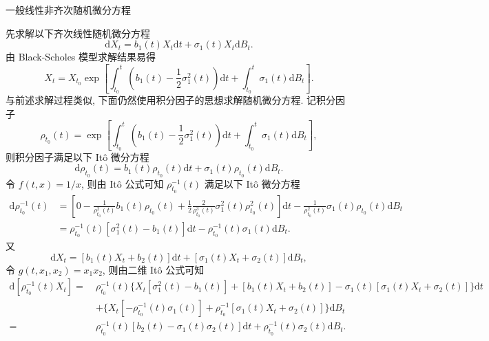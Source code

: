 \documentclass[openany]{ctexbook}
\theoremstyle{kaiti}
\theoremstyle{normal}
\begin{document}
一般线性非齐次随机微分方程

先求解以下齐次线性随机微分方程
\begin{equation}
  \mathrm{d}X_t=b_1(t) X_t\mathrm{d}t+\sigma_1(t) X_t\mathrm{d}B_t.
\end{equation}
由 Black-Scholes 模型求解结果易得
\begin{equation}
  X_t=X_{t_0}\exp\left[\int_{t_0}^t\left(b_1(t)-\frac{1}{2}\sigma_1^2(t)\right)\mathrm{d}t+\int_{t_0}^t\sigma_1(t) \mathrm{d}B_t\right].
\end{equation}
与前述求解过程类似, 下面仍然使用积分因子的思想求解随机微分方程. 记积分因子
\begin{equation}
  \rho_{t_0}(t)=\exp\left[\int_{t_0}^t\left(b_1(t)-\frac{1}{2}\sigma_1^2(t)\right)\mathrm{d}t+\int_{t_0}^t\sigma_1(t) \mathrm{d}B_t\right],
\end{equation}
则积分因子满足以下 It\^o 微分方程
\begin{equation}
  \mathrm{d}\rho_{t_0}(t)=b_1(t) \rho_{t_0}(t)\mathrm{d}t+\sigma_1(t) \rho_{t_0}(t)\mathrm{d}B_t.
\end{equation}
令 $f(t,x)=1/x$, 则由 It\^o 公式可知 $\rho_{t_0}^{-1}(t)$ 满足以下 It\^o 微分方程
\begin{equation}
  \begin{aligned}
    \mathrm{d}\rho_{t_0}^{-1}(t)
    &=\left[0-\frac{1}{\rho_{t_0}^2(t)}b_1(t) \rho_{t_0}(t)+\frac{1}{2}\frac{2}{\rho_{t_0}^3(t)}\sigma_1^2(t) \rho_{t_0}^2(t)\right]\mathrm{d}t-\frac{1}{\rho_{t_0}^2(t)}\sigma_1(t) \rho_{t_0}(t)\mathrm{d}B_t\\
    &=\rho_{t_0}^{-1}(t)[\sigma_1^2(t)-b_1(t)]\mathrm{d}t-\rho_{t_0}^{-1}(t)\sigma_1(t)\mathrm{d}B_t.
  \end{aligned}
\end{equation}
又
\begin{equation}
  \mathrm{d}X_t=[b_1(t) X_t+b_2(t)]\mathrm{d}t+[\sigma_1(t) X_t+\sigma_2(t)]\mathrm{d}B_t,
\end{equation}
令 $g(t,x_1,x_2)=x_1x_2$, 则由二维 It\^o 公式可知
\begin{equation}
  \begin{aligned}
    \mathrm{d}[\rho_{t_0}^{-1}(t)X_t]
    =~&\rho_{t_0}^{-1}(t)\Big\{X_t[\sigma_1^2(t)-b_1(t)]+[b_1(t) X_t+b_2(t)]-\sigma_1(t)[\sigma_1(t) X_t+\sigma_2(t)]\Big\}\mathrm{d}t\\
    &+\Big\{X_t[-\rho_{t_0}^{-1}(t)\sigma_1(t)]+\rho_{t_0}^{-1}[\sigma_1(t) X_t+\sigma_2(t)]\Big\}\mathrm{d}B_t\\
    =~&\rho_{t_0}^{-1}(t)[b_2(t)-\sigma_1(t)\sigma_2(t)]\mathrm{d}t+\rho_{t_0}^{-1}(t)\sigma_2(t)\mathrm{d}B_t.\\
  \end{aligned}
\end{equation}
\end{document}
